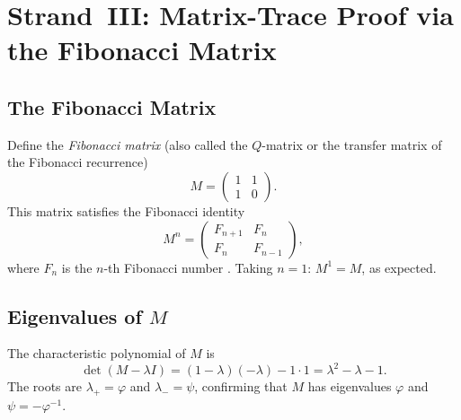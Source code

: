 \begin{center}
\end{center}


\section{Strand~III: Matrix-Trace Proof via the Fibonacci Matrix}%
\label{sec:strand-III-matrix}

\subsection{The Fibonacci Matrix}

Define the \emph{Fibonacci matrix} (also called the $Q$-matrix or
the transfer matrix of the Fibonacci recurrence)
\[
  M = \begin{pmatrix} 1 & 1 \\ 1 & 0 \end{pmatrix}.
\]
This matrix satisfies the Fibonacci identity
\[
  M^{n} = \begin{pmatrix} F_{n+1} & F_{n} \\ F_{n} & F_{n-1} \end{pmatrix},
\]
where $F_{n}$ is the $n$-th Fibonacci number \cite{koshy_fib_lucas}.
Taking $n=1$: $M^{1} = M$, as expected.

\subsection{Eigenvalues of $M$}

The characteristic polynomial of $M$ is
\[
  \det(M - \lambda I)
  = (1-\lambda)(-\lambda) - 1 \cdot 1
  = \lambda^{2} - \lambda - 1.
\]
The roots are $\lambda_{+} = \varphi$ and $\lambda_{-} = \psi$,
confirming that $M$ has eigenvalues $\varphi$ and $\psi = -\varphi^{-1}$.

